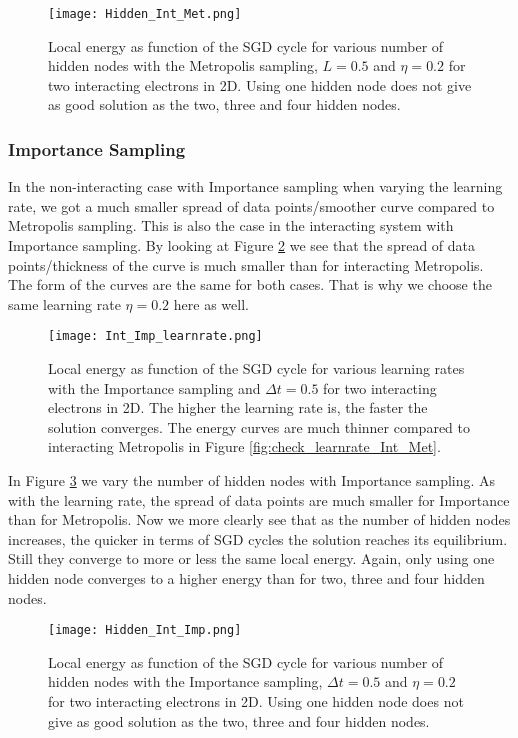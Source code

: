 \documentclass[12pt,a4paper,english]{article}
\begin{document}
\begin{figure}[t!]
	\centering\texttt{[image: Hidden\_Int\_Met.png]}
	\caption{Local energy as function of the SGD cycle for various number of hidden nodes with the Metropolis sampling, $L=0.5$ and $\eta=0.2$ for two interacting electrons in 2D. Using one hidden node does not give as good solution as the two, three and four hidden nodes. \label{fig:check_hidden_Int_Met}}
\end{figure} 

\newpage
\subsubsection{Importance Sampling}
\label{subsubsect:Results_int_Importance}
In the non-interacting case with Importance sampling when varying the learning rate, we got a much smaller spread of data points/smoother curve compared to Metropolis sampling. This is also the case in the interacting system with Importance sampling. By looking at Figure \ref{fig:check_learnrate_Int_Imp} we see that the spread of data points/thickness of the curve is much smaller than for interacting Metropolis. The form of the curves are the same for both cases. That is why we choose the same learning rate $\eta=0.2$ here as well.

\begin{figure}[t!]
	\centering\texttt{[image: Int\_Imp\_learnrate.png]}
	\caption{Local energy as function of the SGD cycle for various learning rates with the Importance sampling and $\Delta t=0.5$ for two interacting electrons in 2D. The higher the learning rate is, the faster the solution converges. The energy curves are much thinner compared to interacting Metropolis in Figure \ref{fig:check_learnrate_Int_Met}. \label{fig:check_learnrate_Int_Imp}}
\end{figure}

\newpage
In Figure \ref{fig:check_hidden_Int_Imp} we vary the number of hidden nodes with Importance sampling. As with the learning rate, the spread of data points are much smaller for Importance than for Metropolis. Now we more clearly see that as the number of hidden nodes increases, the quicker in terms of SGD cycles the solution reaches its equilibrium. Still they converge to more or less the same local energy. Again, only using one hidden node converges to a higher energy than for two, three and four hidden nodes.

\begin{figure}[t!]
	\centering\texttt{[image: Hidden\_Int\_Imp.png]}
	\caption{Local energy as function of the SGD cycle for various number of hidden nodes with the Importance sampling, $\Delta t=0.5$ and $\eta=0.2$ for two interacting electrons in 2D. Using one hidden node does not give as good solution as the two, three and four hidden nodes. \label{fig:check_hidden_Int_Imp}}
\end{figure} 
\end{document}
